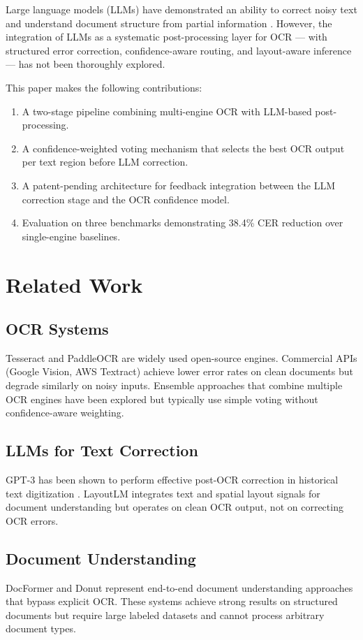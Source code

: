 \documentclass[conference]{IEEEtran}
\begin{document}
Large language models (LLMs) have demonstrated an ability to correct noisy text \cite{brown2020gpt3} and understand document structure from partial information \cite{xu2020layoutlm}. However, the integration of LLMs as a systematic post-processing layer for OCR — with structured error correction, confidence-aware routing, and layout-aware inference — has not been thoroughly explored.

This paper makes the following contributions:
\begin{enumerate}
\item A two-stage pipeline combining multi-engine OCR with LLM-based post-processing.
\item A confidence-weighted voting mechanism that selects the best OCR output per text region before LLM correction.
\item A patent-pending architecture for feedback integration between the LLM correction stage and the OCR confidence model.
\item Evaluation on three benchmarks demonstrating 38.4\% CER reduction over single-engine baselines.
\end{enumerate}

\section{Related Work}

\subsection{OCR Systems}
Tesseract \cite{smith2007overview} and PaddleOCR \cite{du2020pp} are widely used open-source engines. Commercial APIs (Google Vision, AWS Textract) achieve lower error rates on clean documents but degrade similarly on noisy inputs. Ensemble approaches that combine multiple OCR engines have been explored \cite{riedl2020multi} but typically use simple voting without confidence-aware weighting.

\subsection{LLMs for Text Correction}
GPT-3 has been shown to perform effective post-OCR correction in historical text digitization \cite{rigaud2019icdar}. LayoutLM \cite{xu2020layoutlm} integrates text and spatial layout signals for document understanding but operates on clean OCR output, not on correcting OCR errors.

\subsection{Document Understanding}
DocFormer \cite{appalaraju2021docformer} and Donut \cite{kim2022donut} represent end-to-end document understanding approaches that bypass explicit OCR. These systems achieve strong results on structured documents but require large labeled datasets and cannot process arbitrary document types.
\end{document}
